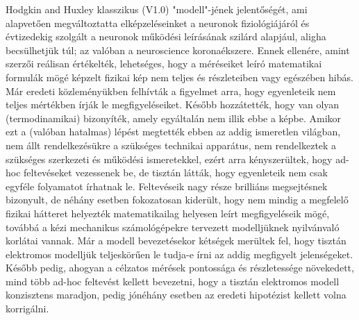 \else %

Hodgkin and Huxley klasszikus (V1.0) "modell"-jének jelentőségét,
ami alapvetően megváltoztatta elképzeléseinket a neuronok 
fiziológiájáról és évtizedekig szolgált a neuronok működési leírásának szilárd alapjául,  aligha becsülhetjük túl; az valóban a neuroscience koronaékszere.
Ennek ellenére, amint szerzői reálisan értékelték, lehetséges, hogy
a méréseiket leíró mate\-matikai formulák mögé képzelt
fizikai kép nem teljes és részleteiben vagy egészében hibás.
Már eredeti közleményükben felhívták a figyelmet arra, hogy
egyenleteik nem teljes mértékben írják le megfigyeléseiket.
Később hozzátették, hogy van olyan (termodinamikai) bizonyíték, amely egyáltalán nem illik ebbe a képbe.
Amikor ezt a (valóban hatalmas) lépést megtették ebben az addig
ismeretlen világban, nem állt rendelkezésükre a szükséges 
technikai apparátus, nem rendelkeztek a szükséges 
szerkezeti és működési ismeretekkel, ezért arra kényszerültek, 
hogy ad-hoc feltevéseket vezessenek be, de tisztán látták,
hogy egyenleteik nem csak egyféle folyamatot írhatnak le. 
Feltevéseik nagy része brilliáns megsejtésnek bizonyult,
de néhány esetben fokozatosan kiderült, hogy 
nem mindig a megfelelő fizikai hátteret helyezték matematikailag helyesen leírt megfigyeléseik mögé,
továbbá a kézi mechanikus számológépekre tervezett modelljüknek nyilvánvaló korlátai vannak.
Már a modell bevezetésekor kétségek merültek fel, hogy 
tisztán elektromos modelljük teljeskörűen le tudja-e írni
az addig megfigyelt jelenségeket. Később pedig, ahogyan
a célzatos mérések pontossága és részletessége növekedett, mind több
ad-hoc feltevést kellett bevezetni, hogy a tisztán elektromos
modell konzisztens maradjon, pedig jónéhány esetben
az eredeti hipotézist kellett volna korrigálni.
\fi 


